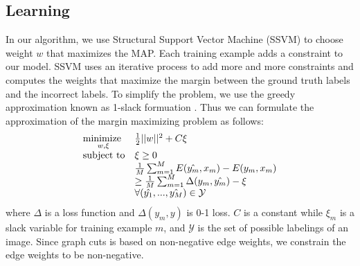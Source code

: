 \documentclass[10pt,twocolumn,letterpaper]{article}
\newcommand{\minimize}[1]{\underset{#1}{\operatorname{minimize}\;}}
\begin{document}
\subsection{Learning}
In our algorithm, we use Structural Support Vector Machine (SSVM) \cite{SSVM20, SSVM21} to choose weight $w$ that maximizes the MAP. 
Each training example adds a constraint to our model. SSVM uses an iterative
process to add more and more constraints and computes the weights that maximize the margin between the ground truth labels and the incorrect labels. To simplify the problem, we use the greedy approximation known as 1-slack formuation \cite{SSVM9} . Thus we can formulate the approximation of the margin maximizing problem as follows:
\begin{equation}
\begin{array}{l l}
\minimize{w,\xi} & \frac{1}{2}||w||^2 + C\xi \nonumber \\
\text{subject to} & \xi \ge 0 \\
& \frac{1}{M}\sum_{m=1}^{M}E(\hat{y_m},x_m)-E(y_m, x_m) \\
& \ge \frac{1}{M}\sum_{m=1}^{M}\Delta(y_m, \hat{y_m}) - \xi \nonumber \\
& \forall (\hat{y_1},...,\hat{y_M}) \in \mathcal{Y} \nonumber \\
\end{array}
\end{equation}
where $\Delta$ is a loss function and $\Delta(y_m, y)$ is 0-1 loss. $C$ is a constant while $\xi_m$ is a slack variable for training example $m$, and $\mathcal{Y}$ is the set of possible labelings of an image. Since graph cuts is based on non-negative edge weights, we constrain the edge weights to be non-negative.
\end{document}
